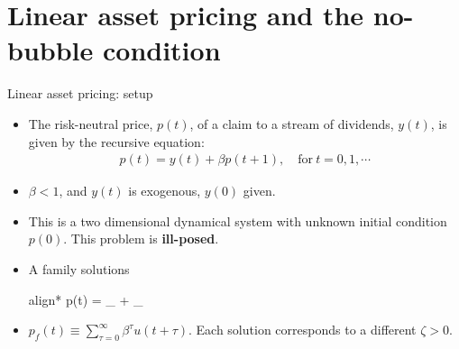\documentclass[aspectratio=169,10pt]{beamer}
\newcommand{\emphcolor}[1]{\textbf{\textcolor{emphcolorval}{#1}}}
\begin{document}
\section{\textcolor{PennBlue}{Linear asset pricing and the no-bubble condition}}

\begin{frame}{Linear asset pricing: setup }
	\begin{itemize}
	\item The risk-neutral price, $p(t)$, of a claim to a stream of dividends, $y(t)$, is given by
	the recursive equation:
	\begin{align*}
		p(t) = y(t) + \beta p(t+1), \quad \text{for}~ t=0,1,\cdots
	\end{align*}
	\item $\beta<1$, and $y(t)$ is exogenous, $y(0)$ given.
	\item  This is a two dimensional dynamical system with unknown initial condition  $p(0)$. This problem is \emphcolor{ill-posed}.
	\item A family solutions
	 \begin{empheq}[box=\tcbhighmath]{align*}
	 	p(t) = _{} +  _{}
	 \end{empheq}
	 \item $p_f(t) \equiv \sum_{\tau =0}^\infty \beta^\tau u(t+\tau)$. Each solution corresponds to a different $\zeta>0$.
	\end{itemize}
\end{frame}
\end{document}
